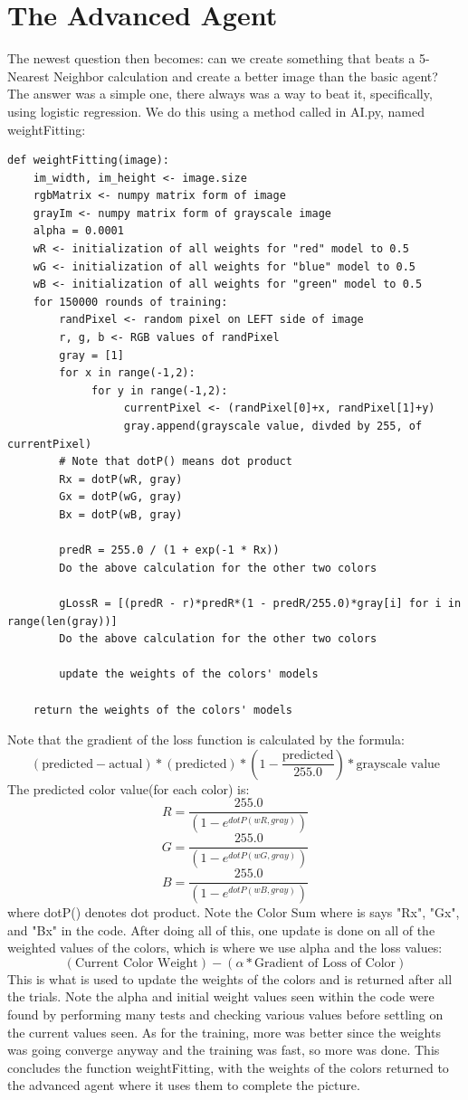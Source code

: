 \documentclass[11pt]{article}
\begin{document}
\section{The Advanced Agent}
The newest question then becomes: can we create something that beats a 5-Nearest Neighbor calculation and create a better image than the basic agent? The answer was a simple one, there always was a way to beat it, specifically, using logistic regression. We do this using a method called in AI.py, named weightFitting:

\begin{verbatim}
def weightFitting(image):
    im_width, im_height <- image.size
    rgbMatrix <- numpy matrix form of image
    grayIm <- numpy matrix form of grayscale image
    alpha = 0.0001
    wR <- initialization of all weights for "red" model to 0.5
    wG <- initialization of all weights for "blue" model to 0.5
    wB <- initialization of all weights for "green" model to 0.5
    for 150000 rounds of training:
        randPixel <- random pixel on LEFT side of image
        r, g, b <- RGB values of randPixel
        gray = [1]
        for x in range(-1,2):
             for y in range(-1,2):
                  currentPixel <- (randPixel[0]+x, randPixel[1]+y) 
                  gray.append(grayscale value, divded by 255, of currentPixel)
        # Note that dotP() means dot product
        Rx = dotP(wR, gray)
        Gx = dotP(wG, gray)
        Bx = dotP(wB, gray)

        predR = 255.0 / (1 + exp(-1 * Rx))
        Do the above calculation for the other two colors

        gLossR = [(predR - r)*predR*(1 - predR/255.0)*gray[i] for i in range(len(gray))]
        Do the above calculation for the other two colors

        update the weights of the colors' models

    return the weights of the colors' models
\end{verbatim}
Note that the gradient of the loss function is calculated by the formula:
\[
(\text{predicted} - \text{actual})*(\text{predicted})*(1 - \frac{\text{predicted}}{255.0}) * \text{grayscale value}
\]
The predicted color value(for each color) is:
\[
R = \frac{255.0}{(1 - e^{dotP(wR, gray)})}
\]
\[
G = \frac{255.0}{(1 - e^{dotP(wG, gray)})}
\]
\[
B = \frac{255.0}{(1 - e^{dotP(wB, gray)})}
\]
where dotP() denotes dot product.
Note the Color Sum where is says "Rx", "Gx", and "Bx" in the code. After doing all of this, one update is done on all of the weighted values of the colors, which is where we use alpha and the loss values:
\[
(\text{Current Color Weight}) - (\alpha * \text{Gradient of Loss of Color})
\]
This is what is used to update the weights of the colors and is returned after all the trials. Note the alpha and initial weight values seen within the code were found by performing many tests and checking various values before settling on the current values seen. As for the training, more was better since the weights was going converge anyway and the training was fast, so more was done. This concludes the function weightFitting, with the weights of the colors returned to the advanced agent where it uses them to complete the picture.
\end{document}
